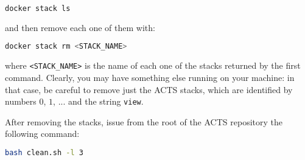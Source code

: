 \begin{itemize}
\begin{lstlisting}[language=bash]
docker stack ls
\end{lstlisting}

and then remove each one of them with:

\begin{lstlisting}[language=bash]
docker stack rm <STACK_NAME>
\end{lstlisting}

where \texttt{<STACK\_NAME>} is the name of each one of the stacks returned by
the first command.
Clearly, you may have something else running on your machine: in that case, be
careful to remove just the ACTS stacks, which are identified by numbers $0$,
$1$, ... and the string \texttt{view}.

After removing the stacks, issue from the root of the ACTS repository the
following command:

\begin{lstlisting}[language=bash]
bash clean.sh -l 3
\end{lstlisting}

\end{itemize}
